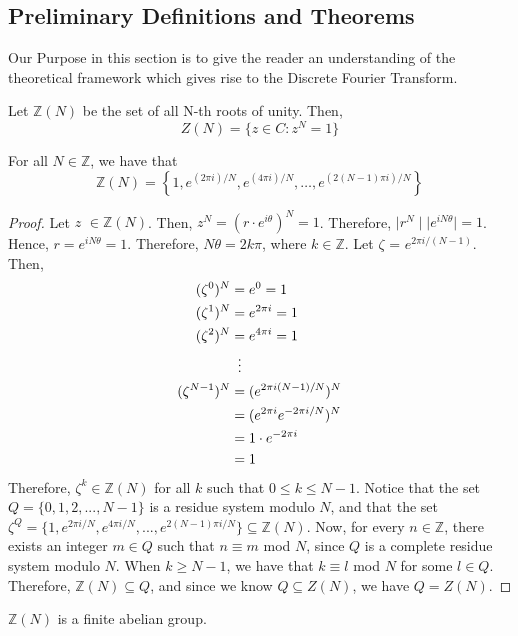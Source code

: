 \documentclass[../article.tex]{subfiles}
\begin{document}
\subsection*{Preliminary Definitions and Theorems}
	Our Purpose in this section is to give the reader an understanding of the theoretical framework which gives rise to the Discrete Fourier Transform.

\begin{definition}
Let $\mathbb{Z}(N)$ be the set of all N-th roots of unity. Then,
 \[Z(N) = \{z \in C : z^N = 1 \}\]
\end{definition}
\begin{theorem}
For all $N \in \mathbb{Z}$, we have that
\[\mathbb{Z}(N)= \left\{1, e^{(2 \pi i)/N}, e^{(4 \pi i)/N}, \ldots, e^{(2(N-1) \pi i)/N}\right\}\]
\end{theorem}

\begin{proof}
Let $z$ $\in \mathbb{Z}(N)$. Then, $z^N = (r \cdot e^{i \theta})^N = 1$. Therefore, $\mid r^N \mid \mid e^{i N \theta} \mid = 1$. Hence, $r = e^{i N \theta} = 1$. Therefore, $N\theta = 2k\pi$, where $k \in \mathbb{Z}$. Let $\zeta$ = $e^{2 \pi i /(N-1)}$. Then,
\begin{align*}
	(\zeta^0)^N &= e^0 = 1 \\
	(\zeta^1)^N &= e^{2 \pi i} = 1 \\
	(\zeta^2)^N &= e^{4 \pi i} = 1 \\
	{} &\vdotswithin{=}\\
	(\zeta^{N-1})^N &= (e^{2 \pi i(N-1)/N})^N \\
	{} &= (e^{2 \pi i}e^{-2 \pi i/N})^N \\
	{} &= 1 \cdot e^{-2 \pi i} \\
	{} &= 1
\end{align*}
Therefore, $\zeta^k \in \mathbb{Z}(N)$ for all $k$ such that $0 \leq k \leq N-1$. Notice that the set $Q = \{0, 1, 2, ..., N-1\}$ is a residue system modulo $N$, and that the set $\zeta^Q = \{1, e^{2 \pi i/N}, e^{4 \pi i/N}, ..., e^{2(N-1) \pi i/N}\} \subseteq \mathbb{Z}(N)$. Now, for every $n \in \mathbb{Z}$, there exists an integer $m \in Q$ such that $n \equiv m$ mod $N$, since $Q$ is a complete residue system modulo $N$. When $k \geq N-1$, we have that $k \equiv l$ mod $N$ for some $l \in Q$. Therefore, $\mathbb{Z}(N) \subseteq Q$, and since we know $Q \subseteq Z(N)$, we have $Q = Z(N)$.
\end{proof}

\begin{theorem}
$\mathbb{Z}(N)$ is a finite abelian group.
\end{theorem}
\end{document}
